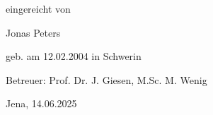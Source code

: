 \begin{titlepage}
    {eingereicht von\par}
    {\large Jonas Peters\par} %
    {geb. am 12.02.2004 in Schwerin\par} %
    \vspace{0.5cm}

    {Betreuer: Prof. Dr. J. Giesen, M.Sc. M. Wenig\par} %
    \vfill %

    {Jena, 14.06.2025\par} %

\end{titlepage}

% 